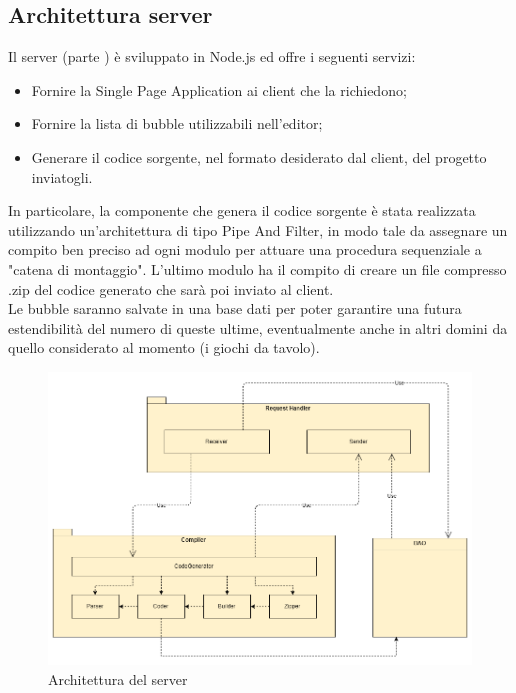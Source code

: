 \documentclass[../DefinizioneDiProdotto.tex]{subfiles}
\begin{document}
			\subsection{Architettura server}
				Il server (parte ) è sviluppato in Node.js ed offre i seguenti servizi:
				\begin{itemize}
					\item Fornire la Single Page Application ai client che la richiedono;
					\item Fornire la lista di bubble utilizzabili nell'editor;
					\item Generare il codice sorgente, nel formato desiderato dal client, del progetto
					inviatogli.
				\end{itemize}
				In particolare, la componente che genera il codice sorgente è stata realizzata utilizzando
				un'architettura di tipo Pipe And Filter, in modo tale da assegnare un compito ben preciso
				ad ogni modulo per attuare una procedura sequenziale a "catena di montaggio". L'ultimo
				modulo ha il compito di creare un file compresso .zip del codice generato che sarà poi
				inviato al client.\\
				Le bubble saranno salvate in una base dati per poter garantire una futura estendibilità del
				numero di queste ultime, eventualmente anche in altri domini da quello considerato al
				momento (i giochi da tavolo).
				\begin{figure}[H]\label{fig:ServerSubsystem}
					\centering
					\includegraphics[scale=0.4]{Immagini/DiagrammaArchitettura/ServerSubsystem.png}
					\caption{Architettura del server}
				\end{figure}
\end{document}

